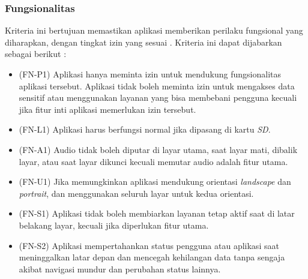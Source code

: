 \subsubsection{Fungsionalitas}
Kriteria ini bertujuan memastikan aplikasi memberikan perilaku fungsional yang diharapkan, dengan tingkat izin yang sesuai \cite{androiddev}. Kriteria ini dapat dijabarkan sebagai berikut : 
\begin{itemize}
    \item (FN-P1) Aplikasi hanya meminta izin untuk mendukung fungsionalitas aplikasi tersebut. Aplikasi tidak boleh meminta izin untuk mengakses data sensitif atau menggunakan layanan yang bisa membebani pengguna kecuali jika fitur inti aplikasi memerlukan izin tersebut.
    \item (FN-L1) Aplikasi harus berfungsi normal jika dipasang di kartu \textit{SD}.
    \item (FN-A1) Audio tidak boleh diputar di layar utama, saat layar mati, dibalik layar, atau saat layar dikunci kecuali memutar audio adalah fitur utama.
    \item (FN-U1) Jika memungkinkan aplikasi mendukung orientasi \textit{landscape} dan \textit{portrait}, dan menggunakan seluruh layar untuk kedua orientasi.
    \item (FN-S1) Aplikasi tidak boleh membiarkan layanan tetap aktif saat di latar belakang layar, kecuali jika diperlukan fitur utama.
    \item (FN-S2) Aplikasi mempertahankan status pengguna atau aplikasi saat meninggalkan latar depan dan mencegah kehilangan data tanpa sengaja akibat navigasi mundur dan perubahan status lainnya. 
\end{itemize}

